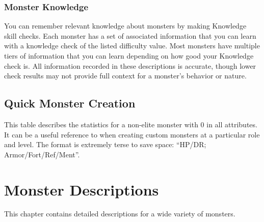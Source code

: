     \subsection{Monster Knowledge}
        You can remember relevant knowledge about monsters by making Knowledge skill checks.
        Each monster has a set of associated information that you can learn with a knowledge check of the listed difficulty value.
        Most monsters have multiple tiers of information that you can learn depending on how good your Knowledge check is.
        All information recorded in these descriptions is accurate, though lower check results may not provide full context for a monster's behavior or nature.

\section{Quick Monster Creation}

    This table describes the statistics for a non-elite monster with 0 in all attributes.
    It can be a useful reference to when creating custom monsters at a particular role and level.
    The format is extremely terse to save space: ``HP/DR; Armor/Fort/Ref/Ment''.

    

\chapter{Monster Descriptions}

This chapter contains detailed descriptions for a wide variety of monsters.



